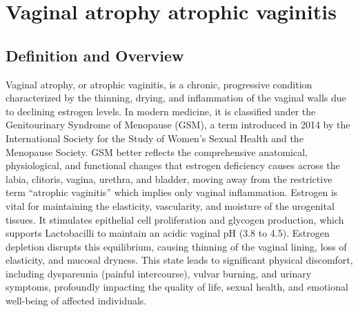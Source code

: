 \chapter{Vaginal atrophy atrophic vaginitis}

\section*{Definition and Overview}
Vaginal atrophy, or atrophic vaginitis, is a chronic, progressive condition characterized by the thinning, drying, and inflammation of the vaginal walls due to declining estrogen levels. In modern medicine, it is classified under the Genitourinary Syndrome of Menopause (GSM), a term introduced in 2014 by the International Society for the Study of Women's Sexual Health and the Menopause Society. GSM better reflects the comprehensive anatomical, physiological, and functional changes that estrogen deficiency causes across the labia, clitoris, vagina, urethra, and bladder, moving away from the restrictive term ``atrophic vaginitis'' which implies only vaginal inflammation. Estrogen is vital for maintaining the elasticity, vascularity, and moisture of the urogenital tissues. It stimulates epithelial cell proliferation and glycogen production, which supports Lactobacilli to maintain an acidic vaginal pH (3.8 to 4.5). Estrogen depletion disrupts this equilibrium, causing thinning of the vaginal lining, loss of elasticity, and mucosal dryness. This state leads to significant physical discomfort, including dyspareunia (painful intercourse), vulvar burning, and urinary symptoms, profoundly impacting the quality of life, sexual health, and emotional well-being of affected individuals.

